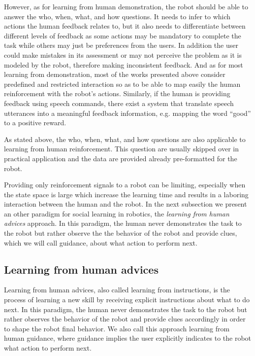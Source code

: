 However, as for learning from human demonstration, the robot should be able to answer the who, when, what, and how questions. It needs to infer to which actions the human feedback relates to, but it also needs to differentiate between different levels of feedback as some actions may be mandatory to complete the task while others may just be preferences from the users. In addition the user could make mistakes in its assessment or may not perceive the problem as it is modeled by the robot, therefore making inconsistent feedback. And as for most learning from demonstration, most of the works presented above consider predefined and restricted interaction so as to be able to map easily the human reinforcement with the robot's actions. Similarly, if the human is providing feedback using speech commands, there exist a system that translate speech utterances into a meaningful feedback information, e.g. mapping the word ``good'' to a positive reward.

\transition

As stated above, the who, when, what, and how questions are also applicable to learning from human reinforcement. This question are usually skipped over in practical application and the data are provided already pre-formatted for the robot.

Providing only reinforcement signals to a robot can be limiting, especially when the state space is large which increase the learning time and results in a laboring interaction between the human and the robot. In the next subsection we present an other paradigm for social learning in robotics, the \emph{learning from human advices} approach. In this paradigm, the human never demonstrates the task to the robot but rather observe the the behavior of the robot and provide clues, which we will call guidance, about what action to perform next.

\subsection{Learning from human advices}

Learning from human advices, also called learning from instructions, is the process of learning a new skill by receiving explicit instructions about what to do next. In this paradigm, the human never demonstrates the task to the robot but rather observes the behavior of the robot and provide clues accordingly in order to shape the robot final behavior. We also call this approach learning from human guidance, where guidance implies the user explicitly indicates to the robot what action to perform next.

